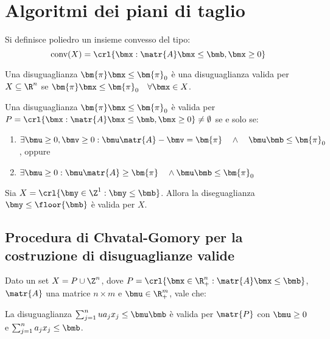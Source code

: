 \documentclass[\main/main.tex]{subfiles}
\begin{document}
\chapter{Algoritmi dei piani di taglio}

\begin{definition}[Poliedro]
    Si definisce poliedro un insieme convesso del tipo:
    \[
        \text{conv}(X) = \crl{\bmx: \matr{A}\bmx \leq \bmb, \bmx \geq 0}
    \]\end{definition}
\begin{definition}
    Una disuguaglianza \(\bm{\pi}\bmx \leq \bm{\pi}_0\) è una disuguaglianza valida per \(X \subseteq \R^n\) se \(\bm{\pi}\bmx \leq \bm{\pi}_0 \quad \forall \bmx \in X\).
\end{definition}

\begin{proposition}
    Una disuguaglianza \(\bm{\pi}\bmx \leq \bm{\pi}_0\) è valida per \(P = \crl{\bmx: \matr{A}\bmx \leq \bmb, \bmx \geq 0} \neq \emptyset \) se e solo se:
    \begin{enumerate}
    \item \(\exists \bmu \geq 0, \bmv \geq 0: \bmu \matr{A} - \bmv = \bm{\pi} \quad \land \quad \bmu\bmb \leq \bm{\pi}_0\), oppure
    \item \(\exists \bmu \geq 0: \bmu \matr{A} \geq \bm{\pi} \quad \land \bmu\bmb \leq \bm{\pi}_0\)
    \end{enumerate}
\end{proposition}

\begin{proposition}
    Sia \(X = \crl{\bmy \in \Z^1: \bmy \leq \bmb}\). Allora la diseguaglianza \(\bmy \leq \floor{\bmb}\) è valida per \(X\).
\end{proposition}

\section{Procedura di Chvatal-Gomory per la costruzione di disuguaglianze valide}
Dato un set \(X = P \cup \Z^n\), dove \(P = \crl{\bmx \in \R^n_+: \matr{A}\bmx \leq \bmb}\), \(\matr{A}\) una matrice \(n\times m\) e \(\bmu \in \R^m_+\), vale che:

La disuguaglianza \(\sum_{j=1}^n ua_j x_j \leq \bmu\bmb \) è valida per \(\matr{P}\) con \(\bmu \geq 0\) e \(\sum_{j=1}^n a_j x_j \leq \bmb \).
\end{document}
